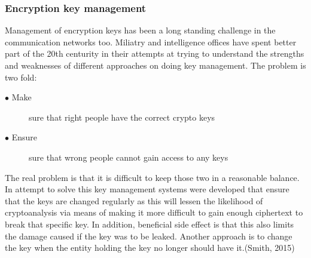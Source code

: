 \documentclass{article}
\begin{document}
\subsubsection{Encryption key management}
Management of encryption keys has been a long standing challenge in the communication networks too. Miliatry and intelligence offices have spent better part of the 20th centurity in their attempts at trying to understand the strengths and weaknesses of different approaches on doing key management. The problem is two fold:
\begin{description}
	\item[$\bullet$ Make] sure that right people have the correct crypto keys
	\item[$\bullet$ Ensure] sure that wrong people cannot gain access to any keys
\end{description} 
The real problem is that it is difficult to keep those two in a reasonable balance. In attempt to solve this key management systems were developed that ensure that the keys are changed regularly as this will lessen the likelihood of cryptoanalysis via means of making it more difficult to gain enough ciphertext to break that specific key. In addition, beneficial side effect is that this also limits the damage caused if the key was to be leaked. Another approach is to change the key when the entity holding the key no longer should have it.(Smith, 2015) 
\end{document}
